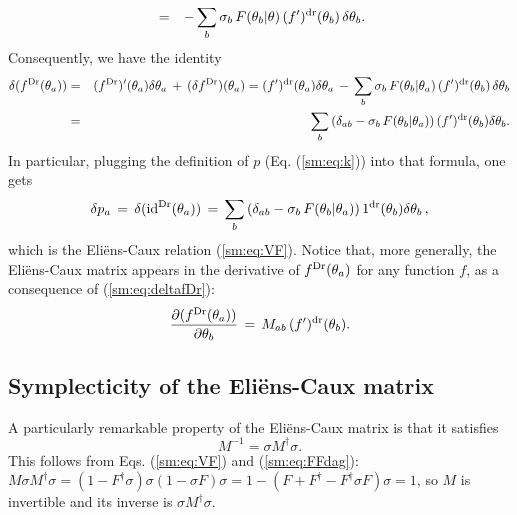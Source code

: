\documentclass[twocolumn,amsfonts,showpacs,superscriptaddress]{revtex4-1}
\begin{document}
\begin{widetext}
\begin{eqnarray}
	&=&- \sum_b \sigma_b \, F(\theta_b | \theta) \,  (f')^{\rm dr}(\theta_b) \, \delta \theta_b .
\end{eqnarray}
Consequently, we have the identity
\begin{eqnarray}
	\label{sm:eq:deltafDr}
\nonumber	\delta ( f^{\rm Dr} (\theta_a)) &=&   ( f^{\rm Dr} )' (\theta_a)  \delta \theta_a \, + \,   ( \delta f^{\rm Dr}  ) (\theta_a)  %
=( f' )^{\rm dr} (\theta_a)  \delta \theta_a \, - \, \sum_b \sigma_b \, F(\theta_b | \theta_a) \,  (f')^{\rm dr}(\theta_b)  \, \delta \theta_b \\
	&=&  \sum_b  \left( \delta_{ab} - \sigma_b \, F(\theta_b | \theta_a)  \right)  (f')^{\rm dr} (\theta_b)  \delta \theta_b    . 
\end{eqnarray}
In particular, plugging the definition of $p$ (Eq. (\ref{sm:eq:k})) into that formula, one gets
\begin{equation*}
	\delta p_a \, = \, \delta ( {\rm id}^{\rm Dr} (\theta_a) ) 
	\, =\,  \sum_b  \left( \delta_{ab} - \sigma_b \, F(\theta_b | \theta_a)  \right)  1^{\rm dr} (\theta_b)  \delta \theta_b  \, ,
\end{equation*}
which is the Eli\"ens-Caux relation (\ref{sm:eq:VF}). Notice that, more generally, the Eli\"ens-Caux matrix appears in the derivative of $f^{\rm Dr} (\theta_a)$ for any function $f$, as a consequence of (\ref{sm:eq:deltafDr}):
\begin{equation}
	\label{sm:eq:dfDR}
		\frac{\partial ( f^{\rm Dr} (\theta_a) )}{\partial \theta_b} \, = \,  M_{ab}  \, (f')^{\rm dr} (\theta_b) .
\end{equation}


\subsection{Symplecticity of the Eli\"ens-Caux matrix}

A particularly remarkable property of the Eli\"ens-Caux matrix is that it satisfies
\begin{equation}
	\label{sm:eq:symplecticity}
	M^{-1} = \sigma M^\dagger \sigma .
\end{equation}
This follows from Eqs. (\ref{sm:eq:VF}) and (\ref{sm:eq:FFdag}): $M \sigma M^\dagger \sigma = (1-F^\dagger \sigma) \sigma (1 - \sigma F) \sigma = 1 - ( F + F^\dagger - F^\dagger \sigma F) \sigma = 1$, so $M$ is invertible and its inverse is $\sigma M^\dagger \sigma$.




\end{widetext}
\end{document}

